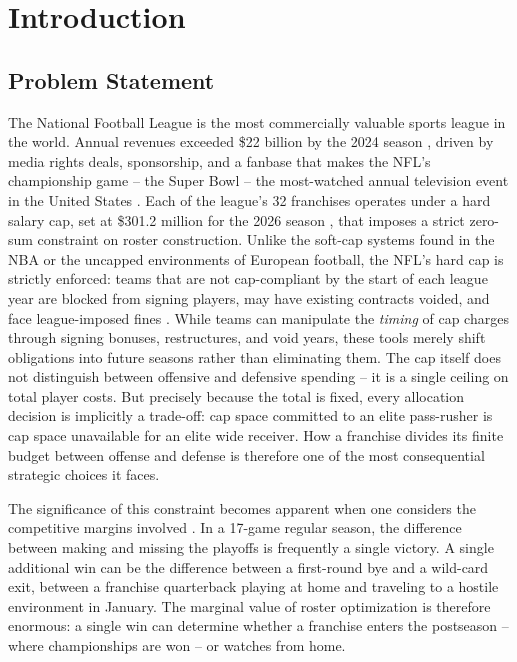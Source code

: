 \chapter{Introduction}
\label{ch:introduction}

\section{Problem Statement}
\label{sec:problem-statement}

The National Football League is the most commercially valuable sports league in the world. Annual revenues exceeded \$22 billion by the 2024 season \parencite{nfl2025revenue}, driven by media rights deals, sponsorship, and a fanbase that makes the NFL's championship game  -- the Super Bowl  -- the most-watched annual television event in the United States \parencite{nielsen2024superbowl}. Each of the league's 32 franchises operates under a hard salary cap, set at \$301.2 million for the 2026 season \parencite{nfl2026cap}, that imposes a strict zero-sum constraint on roster construction. Unlike the soft-cap systems found in the NBA or the uncapped environments of European football, the NFL's hard cap is strictly enforced: teams that are not cap-compliant by the start of each league year are blocked from signing players, may have existing contracts voided, and face league-imposed fines \parencite{nflcba2020}. While teams can manipulate the \emph{timing} of cap charges through signing bonuses, restructures, and void years, these tools merely shift obligations into future seasons rather than eliminating them. The cap itself does not distinguish between offensive and defensive spending  -- it is a single ceiling on total player costs. But precisely because the total is fixed, every allocation decision is implicitly a trade-off: cap space committed to an elite pass-rusher is cap space unavailable for an elite wide receiver. How a franchise divides its finite budget between offense and defense is therefore one of the most consequential strategic choices it faces.

The significance of this constraint becomes apparent when one considers the competitive margins involved \parencite{lopez2018randomness}. In a 17-game regular season, the difference between making and missing the playoffs is frequently a single victory. A single additional win can be the difference between a first-round bye and a wild-card exit, between a franchise quarterback playing at home and traveling to a hostile environment in January. The marginal value of roster optimization is therefore enormous: a single win can determine whether a franchise enters the postseason  -- where championships are won  -- or watches from home.

